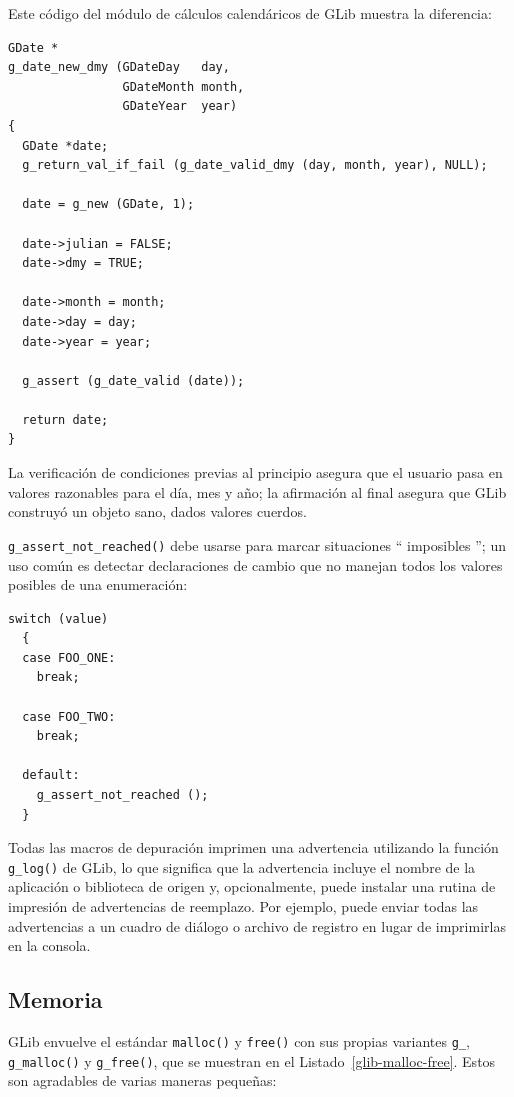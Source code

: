 Este código del módulo de cálculos calendáricos de GLib muestra la diferencia:
\begin{lstlisting}[style=GLib/GTK]
GDate *
g_date_new_dmy (GDateDay   day,
                GDateMonth month,
                GDateYear  year)
{
  GDate *date;
  g_return_val_if_fail (g_date_valid_dmy (day, month, year), NULL);

  date = g_new (GDate, 1);

  date->julian = FALSE;
  date->dmy = TRUE;

  date->month = month;
  date->day = day;
  date->year = year;

  g_assert (g_date_valid (date));

  return date;
}
\end{lstlisting}

La verificación de condiciones previas al principio asegura que el usuario pasa en valores razonables para el día, mes y año; la afirmación al final asegura que GLib construyó un objeto sano, dados valores cuerdos.

\lstinline{g_assert_not_reached()} debe usarse para marcar situaciones `` imposibles ''; un uso común es detectar declaraciones de cambio que no manejan todos los valores posibles de una enumeración:

\begin{lstlisting}[style=GLib/GTK,]
switch (value)
  {
  case FOO_ONE:
    break;

  case FOO_TWO:
    break;

  default:
    g_assert_not_reached ();
  }
\end{lstlisting}

Todas las macros de depuración imprimen una advertencia utilizando la función \lstinline{g_log()} de GLib, lo que significa que la advertencia incluye el nombre de la aplicación o biblioteca de origen y, opcionalmente, puede instalar una rutina de impresión de advertencias de reemplazo. Por ejemplo, puede enviar todas las advertencias a un cuadro de diálogo o archivo de registro en lugar de imprimirlas en la consola.

\subsection{Memoria}

GLib envuelve el estándar \lstinline{malloc()} y \lstinline{free()} con sus propias variantes \lstinline{g_}, \lstinline{g_malloc()} y \lstinline{g_free()}, que se muestran en el Listado~\ref{glib-malloc-free}.
Estos son agradables de varias maneras pequeñas:

